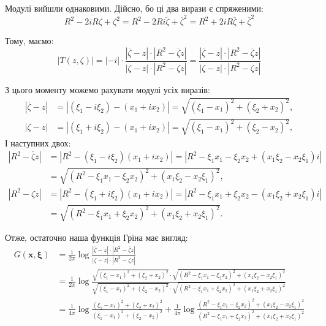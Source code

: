 \documentclass{hw_template}
\begin{document}
Модулі вийшли однаковими. Дійсно, бо ці два вирази є спряженими:
\begin{equation*}
    \overline{R^2-2iR \zeta + \zeta^2} = R^2-2R\overline{i\zeta} + \overline{\zeta}^2 = R^2+2iR\overline{\zeta} + \overline{\zeta}^2
\end{equation*}

Тому, маємо:
\begin{equation*}
    |T(z,\zeta)| = |-i| \cdot \frac{|\overline{\zeta}-z|\cdot |R^2-\overline{\zeta}z|}{|\zeta-z| \cdot |R^2-\zeta z|} =  \frac{|\overline{\zeta}-z|\cdot |R^2-\overline{\zeta}z|}{|\zeta-z| \cdot |R^2-\zeta z|}  
\end{equation*}

З цього моменту можемо рахувати модулі усіх виразів:
\begin{align*}
    |\overline{\zeta}-z| &= |(\xi_1-i\xi_2)-(x_1+ix_2)| = \sqrt{(\xi_1-x_1)^2 + (\xi_2+x_2)^2}, \\
    |\zeta - z| &= |(\xi_1+i\xi_2)-(x_1+ix_2)| = \sqrt{(\xi_1-x_1)^2 + (\xi_2-x_2)^2},
\end{align*}
І наступних двох:
\begin{align*}
    |R^2-\overline{\zeta}z| &= |R^2-(\xi_1-i\xi_2)(x_1+ix_2)| = |R^2-\xi_1 x_1-\xi_2 x_2 + (x_1\xi_2-x_2\xi_1)i| \\
    &=\sqrt{(R^2-\xi_1 x_1-\xi_2 x_2)^2 + (x_1\xi_2-x_2\xi_1)^2}, \\
    |R^2-\zeta z| &= |R^2-(\xi_1+i\xi_2)(x_1+ix_2)| = |R^2-\xi_1 x_1+\xi_2 x_2 - (x_1\xi_2+x_2\xi_1)i| \\
    &=\sqrt{(R^2-\xi_1 x_1+\xi_2 x_2)^2 + (x_1\xi_2+x_2\xi_1)^2}.
\end{align*}

Отже, остаточно наша функція Гріна має вигляд:
\begin{align*}
    G(\mathbf{x},\boldsymbol{\xi}) &= \frac{1}{2\pi} \log \frac{|\overline{\zeta}-z|\cdot |R^2-\overline{\zeta}z|}{|\zeta-z| \cdot |R^2-\zeta z|} \\ 
    &= \frac{1}{2\pi} \log \frac{\sqrt{(\xi_1-x_1)^2 + (\xi_2+x_2)^2} \cdot \sqrt{(R^2-\xi_1 x_1-\xi_2 x_2)^2 + (x_1\xi_2-x_2\xi_1)^2}}{\sqrt{(\xi_1-x_1)^2 + (\xi_2-x_2)^2} \cdot \sqrt{(R^2-\xi_1 x_1+\xi_2 x_2)^2 + (x_1\xi_2+x_2\xi_1)^2}} \\
    &= \frac{1}{4\pi} \log \frac{(\xi_1-x_1)^2 + (\xi_2+x_2)^2}{(\xi_1-x_1)^2 + (\xi_2-x_2)^2} + \frac{1}{4\pi} \log \frac{(R^2-\xi_1 x_1-\xi_2 x_2)^2 + (x_1\xi_2-x_2\xi_1)^2}{(R^2-\xi_1 x_1+\xi_2 x_2)^2 + (x_1\xi_2+x_2\xi_1)^2}
\end{align*}
\end{document}
